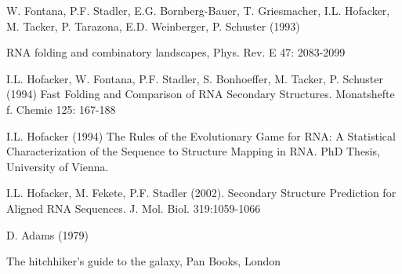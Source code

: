 \begin{DoxyEnumerate}
\begin{DoxyEnumerate}
\begin{DoxyEnumerate}
\begin{DoxyEnumerate}
\begin{DoxyEnumerate}
\begin{DoxyEnumerate}
\begin{DoxyEnumerate}
\begin{DoxyEnumerate}
\begin{DoxyEnumerate}
\begin{DoxyEnumerate}
\begin{DoxyEnumerate}
\begin{DoxyEnumerate}
\begin{DoxyEnumerate}
\begin{DoxyEnumerate}
\item \label{mp__ref_fontana_93b}
\hypertarget{mp__ref_fontana_93b}{}
 W. Fontana, P.F. Stadler, E.G. Bornberg-\/Bauer, T. Griesmacher, I.L. Hofacker, M. Tacker, P. Tarazona, E.D. Weinberger, P. Schuster (1993)\par
 RNA folding and combinatory landscapes, Phys. Rev. E 47: 2083-\/2099
\begin{DoxyEnumerate}
\item \label{mp__ref_hofacker_94a}
\hypertarget{mp__ref_hofacker_94a}{}
 I.L. Hofacker, W. Fontana, P.F. Stadler, S. Bonhoeffer, M. Tacker, P. Schuster (1994) Fast Folding and Comparison of RNA Secondary Structures. Monatshefte f. Chemie 125: 167-\/188
\begin{DoxyEnumerate}
\item \label{mp__ref_hofacker_94b}
\hypertarget{mp__ref_hofacker_94b}{}
 I.L. Hofacker (1994) The Rules of the Evolutionary Game for RNA: A Statistical Characterization of the Sequence to Structure Mapping in RNA. PhD Thesis, University of Vienna.
\begin{DoxyEnumerate}
\item \label{mp__ref_hofacker_02}
\hypertarget{mp__ref_hofacker_02}{}
 I.L. Hofacker, M. Fekete, P.F. Stadler (2002). Secondary Structure Prediction for Aligned RNA Sequences. J. Mol. Biol. 319:1059-\/1066
\begin{DoxyEnumerate}
\item \label{mp__ref_adams_79}
\hypertarget{mp__ref_adams_79}{}
 D. Adams (1979)\par
 The hitchhiker's guide to the galaxy, Pan Books, London 
\end{DoxyEnumerate}
\end{DoxyEnumerate}
\end{DoxyEnumerate}
\end{DoxyEnumerate}
\end{DoxyEnumerate}
\end{DoxyEnumerate}
\end{DoxyEnumerate}
\end{DoxyEnumerate}
\end{DoxyEnumerate}
\end{DoxyEnumerate}
\end{DoxyEnumerate}
\end{DoxyEnumerate}
\end{DoxyEnumerate}
\end{DoxyEnumerate}
\end{DoxyEnumerate}
\end{DoxyEnumerate}
\end{DoxyEnumerate}
\end{DoxyEnumerate}